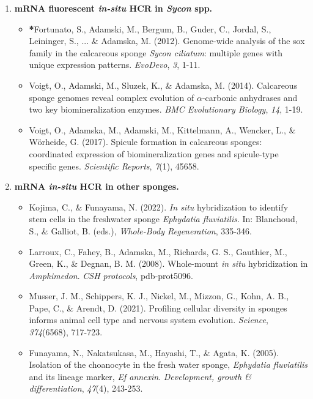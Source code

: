 \documentclass[12pt]{report}
\begin{document}
\begin{enumerate}
	\item \textbf{mRNA fluorescent \textit{in-situ} HCR in \textit{Sycon} spp.}
		\begin{itemize}
			\item \textbf{*}Fortunato, S., Adamski, M., Bergum, B., Guder, C., Jordal, S., Leininger, S., ... \& Adamska, M. (2012). Genome-wide analysis of the sox family in the calcareous sponge \textit{Sycon ciliatum}: multiple genes with unique expression patterns. \textit{EvoDevo}, \textit{3}, 1-11. 
			\item Voigt, O., Adamski, M., Sluzek, K., \& Adamska, M. (2014). Calcareous sponge genomes reveal complex evolution of $\alpha$-carbonic anhydrases and two key biomineralization enzymes. \textit{BMC Evolutionary Biology}, \textit{14}, 1-19. \\ 
			\item Voigt, O., Adamska, M., Adamski, M., Kittelmann, A., Wencker, L., \& W{\"o}rheide, G. (2017). Spicule formation in calcareous sponges: coordinated expression of biomineralization genes and spicule-type specific genes. \textit{Scientific Reports}, \textit{7}(1), 45658. 
		\end{itemize}
	\item \textbf{mRNA \textit{in-situ} HCR in other sponges.}
		\begin{itemize}
			\item Kojima, C., \& Funayama, N. (2022). \textit{In situ} hybridization to identify stem cells in the freshwater sponge \textit{Ephydatia fluviatilis}. In: Blanchoud, S., \& Galliot, B. (eds.), \textit{Whole-Body Regeneration}, 335-346. \\ 
			\item Larroux, C., Fahey, B., Adamska, M., Richards, G. S., Gauthier, M., Green, K., \& Degnan, B. M. (2008). Whole-mount \textit{in situ} hybridization in \textit{Amphimedon}. \textit{CSH protocols}, pdb-prot5096. 
			\item Musser, J. M., Schippers, K. J., Nickel, M., Mizzon, G., Kohn, A. B., Pape, C., \& Arendt, D. (2021). Profiling cellular diversity in sponges informs animal cell type and nervous system evolution. \textit{Science}, \textit{374}(6568), 717-723. 
			\item Funayama, N., Nakatsukasa, M., Hayashi, T., \& Agata, K. (2005). Isolation of the choanocyte in the fresh water sponge, \textit{Ephydatia fluviatilis} and its lineage marker, \textit{Ef annexin}. \textit{Development, growth \& differentiation}, \textit{47}(4), 243-253. 
		\end{itemize}
\end{enumerate}

\clearpage
\end{document}
